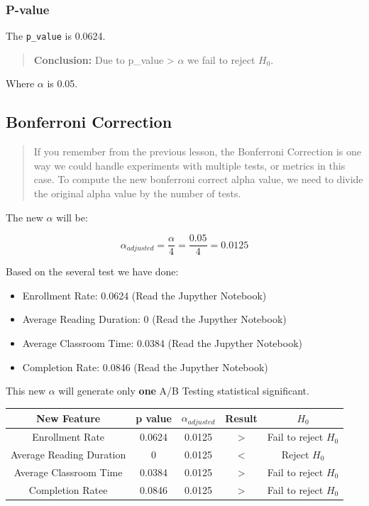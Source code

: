 \documentclass[]{book}
\providecommand{\tightlist}{%
  \setlength{\itemsep}{0pt}\setlength{\parskip}{0pt}}
\begin{document}
\subsubsection*{P-value}\label{p-value-3}

The \texttt{p\_value} is 0.0624.

\begin{quote}
\textbf{Conclusion:} Due to p\_value \textgreater{} \(\alpha\) we fail
to reject \(H_0\).
\end{quote}

Where \(\alpha\) is 0.05.

\subsection{Bonferroni Correction}\label{bonferroni-correction}

\begin{quote}
If you remember from the previous lesson, the Bonferroni Correction is
one way we could handle experiments with multiple tests, or metrics in
this case. To compute the new bonferroni correct alpha value, we need to
divide the original alpha value by the number of tests.
\end{quote}

The new \(\alpha\) will be:

\[\alpha_{adjusted} = \frac{\alpha}{4} = \frac{0.05}{4} = 0.0125\]

Based on the several test we have done:

\begin{itemize}
\tightlist
\item
  Enrollment Rate: 0.0624 (Read the Jupyther Notebook)
\item
  Average Reading Duration: 0 (Read the Jupyther Notebook)
\item
  Average Classroom Time: 0.0384 (Read the Jupyther Notebook)
\item
  Completion Rate: 0.0846 (Read the Jupyther Notebook)
\end{itemize}

This new \(\alpha\) will generate only \textbf{one} A/B Testing
statistical significant.

\begin{longtable}[]{@{}ccccc@{}}
\toprule
New Feature & p value & \(\alpha_{adjusted}\) & Result &
\(H_0\)\tabularnewline
\midrule
\endhead
Enrollment Rate & 0.0624 & 0.0125 & \textgreater{} & Fail to reject
\(H_0\)\tabularnewline
Average Reading Duration & 0 & 0.0125 & \textless{} & Reject
\(H_0\)\tabularnewline
Average Classroom Time & 0.0384 & 0.0125 & \textgreater{} & Fail to
reject \(H_0\)\tabularnewline
Completion Ratee & 0.0846 & 0.0125 & \textgreater{} & Fail to reject
\(H_0\)\tabularnewline
\bottomrule
\end{longtable}
\end{document}
